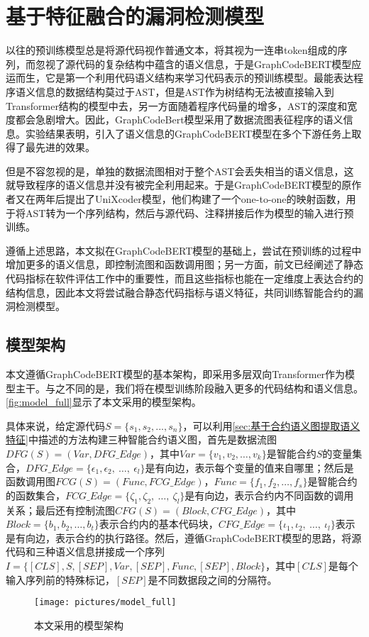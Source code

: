 \section{基于特征融合的漏洞检测模型}
\label{sec:基于特征融合的漏洞检测模型}
以往的预训练模型总是将源代码视作普通文本，将其视为一连串token组成的序列，而忽视了源代码的复杂结构中蕴含的语义信息，于是GraphCodeBERT模型应运而生，它是第一个利用代码语义结构来学习代码表示的预训练模型\cite{guo2020graphcodebert}。最能表达程序语义信息的数据结构莫过于AST，但是AST作为树结构无法被直接输入到Transformer结构的模型中去，另一方面随着程序代码量的增多，AST的深度和宽度都会急剧增大。因此，GraphCodeBert模型采用了数据流图表征程序的语义信息。实验结果表明，引入了语义信息的GraphCodeBERT模型在多个下游任务上取得了最先进的效果。

但是不容忽视的是，单独的数据流图相对于整个AST会丢失相当的语义信息，这就导致程序的语义信息并没有被完全利用起来。于是GraphCodeBERT模型的原作者又在两年后提出了UniXcoder模型\cite{unixcoder}，他们构建了一个one-to-one的映射函数，用于将AST转为一个序列结构，然后与源代码、注释拼接后作为模型的输入进行预训练。

遵循上述思路，本文拟在GraphCodeBERT模型的基础上，尝试在预训练的过程中增加更多的语义信息，即控制流图和函数调用图；另一方面，前文已经阐述了静态代码指标在软件评估工作中的重要性，而且这些指标也能在一定维度上表达合约的结构信息，因此本文将尝试融合静态代码指标与语义特征，共同训练智能合约的漏洞检测模型。

\subsection{模型架构}
\label{sec:模型架构}
本文遵循GraphCodeBERT模型的基本架构，即采用多层双向Transformer作为模型主干。与之不同的是，我们将在模型训练阶段融入更多的代码结构和语义信息。\autoref{fig:model_full}显示了本文采用的模型架构。%


具体来说，给定源代码$S=\{s_{1},s_{2},...,s_{n}\}$，可以利用\autoref{sec:基于合约语义图提取语义特征}中描述的方法构建三种智能合约语义图，首先是数据流图$DFG(S)=(Var,DFG\_Edge)$，其中$Var=\{v_1,v_2,\ldots,v_k\}$是智能合约$S$的变量集合，$DFG\_Edge=\{\epsilon_1,\epsilon_2,~\ldots,~\epsilon_l\}$是有向边，表示每个变量的值来自哪里；然后是函数调用图$FCG(S)=(Func,FCG\_Edge)$，$Func=\{f_1,f_2,\ldots,f_s\}$是智能合约的函数集合，$FCG\_Edge=\{\zeta_1,\zeta_2,~\ldots,~\zeta_l\}$是有向边，表示合约内不同函数的调用关系；最后还有控制流图$CFG(S)=(Block,CFG\_Edge)$，其中$Block=\{b_1,b_2,\ldots,b_t\}$表示合约内的基本代码块，$CFG\_Edge=\{\iota_1,\iota_2,~\ldots,~\iota_l\}$表示是有向边，表示合约的执行路径。然后，遵循GraphCodeBERT模型的思路，将源代码和三种语义信息拼接成一个序列$I=\{[CLS],S,[SEP],Var,[SEP],Func,[SEP],Block\}$，其中$[CLS]$是每个输入序列前的特殊标记，$[SEP]$是不同数据段之间的分隔符。
\begin{figure}[htbp]
    \centering
    \texttt{[image: pictures/model\_full]}
    \caption{\label{fig:model_full}本文采用的模型架构}
\end{figure}

